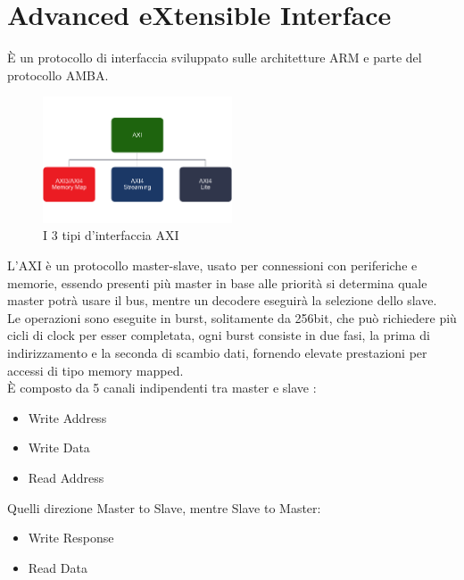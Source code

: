 \section{Advanced eXtensible Interface}
È un protocollo di interfaccia sviluppato sulle architetture ARM e parte del protocollo AMBA.
\begin{figure}
    \centering
    \includegraphics[width=0.5\textwidth]{images/AXI1.png}
    \caption{I 3 tipi d'interfaccia AXI}
    \label{fig:my_label}
\end{figure}
L'AXI è un protocollo master-slave, usato per connessioni con periferiche e memorie, essendo presenti più master in base alle priorità si determina quale master potrà usare il bus, mentre un decodere eseguirà la selezione dello slave.\\
Le operazioni sono eseguite in burst, solitamente da 256bit, che può richiedere più cicli di clock per esser completata, ogni burst consiste in due fasi, la prima di indirizzamento e la seconda di scambio dati, fornendo elevate prestazioni per accessi di tipo memory mapped.\\
È composto da 5 canali indipendenti tra master e slave\cite{AXI} :
\begin{itemize}
    \item Write Address 
    \item Write Data
    \item Read Address
\end{itemize}
Quelli direzione Master to Slave, mentre Slave to Master:
\begin{itemize}
    \item Write Response
    \item Read Data
\end{itemize}
